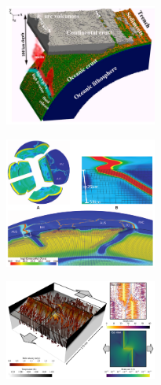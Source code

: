 

\includegraphics[width=5cm]{images/beautiful/zhgt13}
\cite{zhgt13}

\includegraphics[width=5cm]{images/beautiful/stgb10}
\cite{stgb10}

\includegraphics[width=5cm]{images/beautiful/dagg19}
\cite{dagg19}
